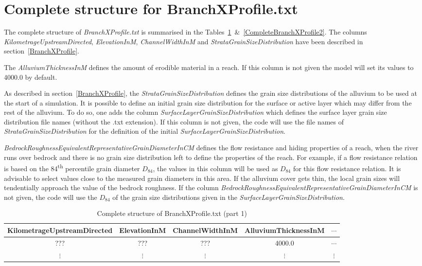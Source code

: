 \documentclass[11pt,a4paper]{article}
\newcommand{\tablefontsize}[0]{\small}
\begin{document}
\section[Complete BranchXProfile.txt]{Complete structure for BranchXProfile.txt}
\label{CompleteBranchXProfile}

The complete structure of \emph{BranchXProfile.txt} is summarised in the Tables~\ref{CompleteBranchXProfile1}~\&{}~\ref{CompleteBranchXProfile2}. The columns \emph{KilometrageUpstreamDirected}, \emph{ElevationInM}, \emph{ChannelWidthInM} and \emph{StrataGrainSizeDistribution} have been described in section~\ref{BranchXProfile}.

The \emph{AlluviumThicknessInM} defines the amount of erodible material in a reach. If this column is not given the model will set its values to 4000.0 by default.

As described in section~\ref{BranchXProfile}, the \emph{StrataGrainSizeDistribution} defines the grain size distributions of the alluvium to be used at the start of a simulation. It is possible to define an initial grain size distribution for the surface or active layer which may differ from the rest of the alluvium. To do so, one adds the column \emph{SurfaceLayerGrainSizeDistribution} which defines the surface layer grain size distribution file names (without the .txt extension). If this column is not given, the code will use the file names of \emph{StrataGrainSizeDistribution} for the definition of the initial \emph{SurfaceLayerGrainSizeDistribution}.

\emph{BedrockRoughnessEquivalentRepresentativeGrainDiameterInCM} defines the flow resistance and hiding properties of a reach, when the river runs over bedrock and there is no grain size distribution left to define the properties of the reach. For example, if a flow resistance relation is based on the 84\textsuperscript{th} percentile grain diameter $D_{84}$, the values in this column will be used as $D_{84}$ for this flow resistance relation. It is advisable to select values close to the measured grain diameters in this area. If the alluvium cover gets thin, the local grain sizes will tendentially approach the value of the bedrock roughness. If the column \emph{BedrockRoughnessEquivalentRepresentativeGrainDiameterInCM} is not given, the code will use the $D_{84}$ of the grain size distributions given in the \emph{SurfaceLayerGrainSizeDistribution}.

\begin{table}[h]
\caption{Complete structure of BranchXProfile.txt (part 1)}
\label{CompleteBranchXProfile1}
\vskip4mm
\tablefontsize
\begin{adjustwidth}{-4cm}{-4cm}
\centering
\begin{tabular}{c|c|c|c|c}
\hline\hline
KilometrageUpstreamDirected & ElevationInM & ChannelWidthInM & AlluviumThicknessInM & $\cdots$\\
\hline
??? & ??? & ??? & 4000.0 & $\cdots$\\
\hline
$\vdots$ & $\vdots$ & $\vdots$ & $\vdots$ & $\vdots$\\
\hline\hline
\end{tabular}
\end{adjustwidth}
\end{table}
\end{document}
